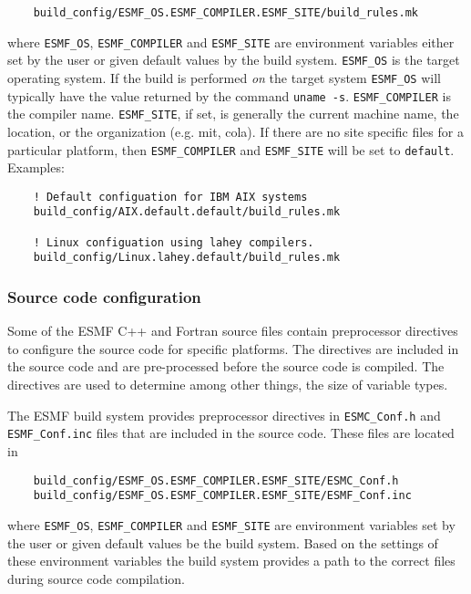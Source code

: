 \begin{verbatim}
    build_config/ESMF_OS.ESMF_COMPILER.ESMF_SITE/build_rules.mk
\end{verbatim}

where {\tt ESMF\_OS}, {\tt ESMF\_COMPILER} and {\tt ESMF\_SITE} are environment
variables either set by the user or given default values by the build
system. {\tt ESMF\_OS} is the target operating system. If the build is performed
{\em on} the target system {\tt ESMF\_OS} will typically have the value
returned by the command {\tt uname -s}. {\tt ESMF\_COMPILER} is the compiler
name. {\tt ESMF\_SITE}, if set, is generally the current machine name, the
location, or the organization (e.g. mit, cola).  If there are no site specific
files for a particular platform, then {\tt ESMF\_COMPILER} and {\tt ESMF\_SITE}
will be set to {\tt default}.  Examples:

\begin{verbatim}
    ! Default configuation for IBM AIX systems
    build_config/AIX.default.default/build_rules.mk
    
    ! Linux configuation using lahey compilers.    
    build_config/Linux.lahey.default/build_rules.mk
\end{verbatim}

\subsubsection{Source code configuration}

Some of the ESMF C++ and Fortran source files contain preprocessor directives
to configure the source code for specific platforms.  The directives are 
included in the source code and are pre-processed before the source code is 
compiled.  The directives are used to determine among other things, the size 
of variable types.

The ESMF build system provides preprocessor directives in 
{\tt ESMC\_Conf.h} and {\tt ESMF\_Conf.inc} files
that are included in the source code. These files are located in

\begin{verbatim}
    build_config/ESMF_OS.ESMF_COMPILER.ESMF_SITE/ESMC_Conf.h
    build_config/ESMF_OS.ESMF_COMPILER.ESMF_SITE/ESMF_Conf.inc
\end{verbatim}

where {\tt ESMF\_OS}, {\tt ESMF\_COMPILER} and {\tt ESMF\_SITE} are
environment variables set by the user or given default values be the
build system.  Based on the settings of these environment variables
the build system provides a path to the correct files during
source code compilation.

